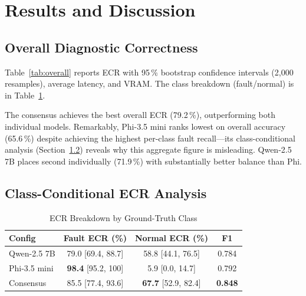 \documentclass[conference, 10pt]{IEEEtran}
\begin{document}
\section{Results and Discussion}

\subsection{Overall Diagnostic Correctness}

Table~\ref{tab:overall} reports ECR with 95\,\% bootstrap confidence intervals (2,000 resamples), average latency, and VRAM. The class breakdown (fault/normal) is in Table~\ref{tab:class_ecr}.

\begin{table}[ht]
\centering
\caption{Overall Performance Metrics (95\,\% Bootstrap CI)}
\label{tab:overall}
\end{table}

The consensus achieves the best overall ECR (79.2\,\%), outperforming both individual models. Remarkably, Phi-3.5 mini ranks lowest on overall accuracy (65.6\,\%) despite achieving the highest per-class fault recall---its class-conditional analysis (Section~\ref{sec:class_ecr}) reveals why this aggregate figure is misleading. Qwen-2.5 7B places second individually (71.9\,\%) with substantially better balance than Phi.

\subsection{Class-Conditional ECR Analysis}
\label{sec:class_ecr}

\begin{table}[ht]
\centering
\caption{ECR Breakdown by Ground-Truth Class}
\label{tab:class_ecr}
\begin{tabular}{@{}lccc@{}}
\toprule
\textbf{Config} & \textbf{Fault ECR (\%)} & \textbf{Normal ECR (\%)} & \textbf{F1} \\ \midrule
Qwen-2.5 7B  & 79.0 [69.4, 88.7] & 58.8 [44.1, 76.5] & 0.784 \\
Phi-3.5 mini & \textbf{98.4} [95.2, 100] & 5.9 [0.0, 14.7]   & 0.792 \\
Consensus    & 85.5 [77.4, 93.6] & \textbf{67.7} [52.9, 82.4] & \textbf{0.848} \\ \bottomrule
\end{tabular}
\end{table}
\end{document}
